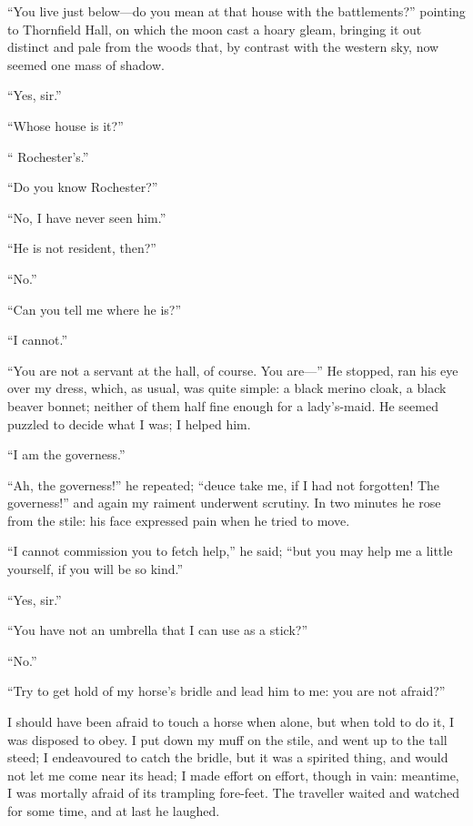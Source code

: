 \enquote{You live just below---do you mean at that house with the
	battlements?} pointing to Thornfield Hall, on which the moon cast a
hoary gleam, bringing it out distinct and pale from the woods that, by
contrast with the western sky, now seemed one mass of shadow.

\enquote{Yes, sir.}

\enquote{Whose house is it?}

\enquote{\Mr{} Rochester's.}

\enquote{Do you know \Mr{} Rochester?}

\enquote{No, I have never seen him.}

\enquote{He is not resident, then?}

\enquote{No.}

\enquote{Can you tell me where he is?}

\enquote{I cannot.}

\enquote{You are not a servant at the hall, of course. You are---} He
stopped, ran his eye over my dress, which, as usual, was quite simple: a
black merino cloak, a black beaver bonnet; neither of them half fine
enough for a lady's-maid. He seemed puzzled to decide what I was; I
helped him.

\enquote{I am the governess.}

\enquote{Ah, the governess!} he repeated; \enquote{deuce take me, if I
	had not forgotten! The governess!} and again my raiment underwent
scrutiny. In two minutes he rose from the stile: his face expressed
pain when he tried to move.

\enquote{I cannot commission you to fetch help,} he said; \enquote{but
	you may help me a little yourself, if you will be so kind.}

\enquote{Yes, sir.}

\enquote{You have not an umbrella that I can use as a stick?}

\enquote{No.}

\enquote{Try to get hold of my horse's bridle and lead him to me: you
	are not afraid?}

I should have been afraid to touch a horse when alone, but when told to
do it, I was disposed to obey. I put down my muff on the stile, and
went up to the tall steed; I endeavoured to catch the bridle, but it was
a spirited thing, and would not let me come near its head; I made effort
on effort, though in vain: meantime, I was mortally afraid of its
trampling fore-feet. The traveller waited and watched for some time,
and at last he laughed.

